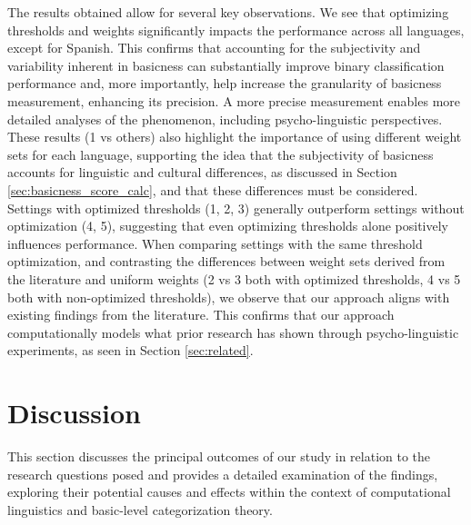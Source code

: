 \documentclass[preprint,12pt,authoryear]{elsarticle}
\begin{document}
The results obtained allow for several key observations. We see that optimizing thresholds and weights significantly impacts the performance across all languages, except for Spanish. %
This confirms that accounting for the subjectivity and variability inherent in basicness can substantially improve binary classification performance and, more importantly, help increase the granularity of basicness measurement, enhancing its precision. A more precise measurement enables more detailed analyses of the phenomenon, including psycho-linguistic perspectives. These results (1 vs others) also highlight the importance of using different weight sets for each language, supporting the idea that the subjectivity of basicness accounts for linguistic and cultural differences, as discussed in Section \ref{sec:basicness_score_calc}, and that these differences must be considered.
Settings with optimized thresholds (1, 2, 3) generally outperform settings without optimization (4, 5), suggesting that even optimizing thresholds alone positively influences performance.
When comparing settings with the same threshold optimization, and contrasting the differences between weight sets derived from the literature and uniform weights (2 vs 3 both with optimized thresholds, 4 vs 5 both with non-optimized thresholds), we observe that our approach aligns with existing findings from the literature. This confirms that our approach computationally models what prior research has shown through psycho-linguistic experiments, as seen in Section \ref{sec:related}.

\section{Discussion}
\label{sec:discussion}

This section discusses the principal outcomes of our study in relation to the research questions posed and provides a detailed examination of the findings, exploring their potential causes and effects within the context of computational linguistics and basic-level categorization theory.
\end{document}
